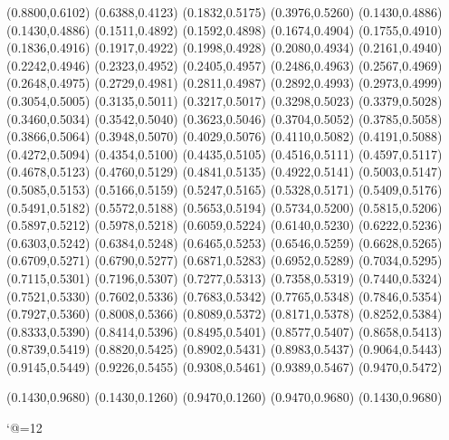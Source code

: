 \PST@Diamond(0.8800,0.6102)
\PST@Diamond(0.6388,0.4123)
\PST@Diamond(0.1832,0.5175)
\PST@Diamond(0.3976,0.5260)
\PST@Dashed(0.1430,0.4886)
(0.1430,0.4886)
(0.1511,0.4892)
(0.1592,0.4898)
(0.1674,0.4904)
(0.1755,0.4910)
(0.1836,0.4916)
(0.1917,0.4922)
(0.1998,0.4928)
(0.2080,0.4934)
(0.2161,0.4940)
(0.2242,0.4946)
(0.2323,0.4952)
(0.2405,0.4957)
(0.2486,0.4963)
(0.2567,0.4969)
(0.2648,0.4975)
(0.2729,0.4981)
(0.2811,0.4987)
(0.2892,0.4993)
(0.2973,0.4999)
(0.3054,0.5005)
(0.3135,0.5011)
(0.3217,0.5017)
(0.3298,0.5023)
(0.3379,0.5028)
(0.3460,0.5034)
(0.3542,0.5040)
(0.3623,0.5046)
(0.3704,0.5052)
(0.3785,0.5058)
(0.3866,0.5064)
(0.3948,0.5070)
(0.4029,0.5076)
(0.4110,0.5082)
(0.4191,0.5088)
(0.4272,0.5094)
(0.4354,0.5100)
(0.4435,0.5105)
(0.4516,0.5111)
(0.4597,0.5117)
(0.4678,0.5123)
(0.4760,0.5129)
(0.4841,0.5135)
(0.4922,0.5141)
(0.5003,0.5147)
(0.5085,0.5153)
(0.5166,0.5159)
(0.5247,0.5165)
(0.5328,0.5171)
(0.5409,0.5176)
(0.5491,0.5182)
(0.5572,0.5188)
(0.5653,0.5194)
(0.5734,0.5200)
(0.5815,0.5206)
(0.5897,0.5212)
(0.5978,0.5218)
(0.6059,0.5224)
(0.6140,0.5230)
(0.6222,0.5236)
(0.6303,0.5242)
(0.6384,0.5248)
(0.6465,0.5253)
(0.6546,0.5259)
(0.6628,0.5265)
(0.6709,0.5271)
(0.6790,0.5277)
(0.6871,0.5283)
(0.6952,0.5289)
(0.7034,0.5295)
(0.7115,0.5301)
(0.7196,0.5307)
(0.7277,0.5313)
(0.7358,0.5319)
(0.7440,0.5324)
(0.7521,0.5330)
(0.7602,0.5336)
(0.7683,0.5342)
(0.7765,0.5348)
(0.7846,0.5354)
(0.7927,0.5360)
(0.8008,0.5366)
(0.8089,0.5372)
(0.8171,0.5378)
(0.8252,0.5384)
(0.8333,0.5390)
(0.8414,0.5396)
(0.8495,0.5401)
(0.8577,0.5407)
(0.8658,0.5413)
(0.8739,0.5419)
(0.8820,0.5425)
(0.8902,0.5431)
(0.8983,0.5437)
(0.9064,0.5443)
(0.9145,0.5449)
(0.9226,0.5455)
(0.9308,0.5461)
(0.9389,0.5467)
(0.9470,0.5472)

\PST@Border(0.1430,0.9680)
(0.1430,0.1260)
(0.9470,0.1260)
(0.9470,0.9680)
(0.1430,0.9680)

\catcode`@=12
\fi
\endpspicture
